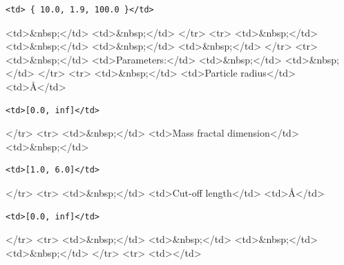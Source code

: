 \begin{verbatim}
<td> { 10.0, 1.9, 100.0 }</td>
\end{verbatim}

\textless{}td\textgreater{}\&nbsp;\textless{}/td\textgreater{} \textless{}td\textgreater{}\&nbsp;\textless{}/td\textgreater{} \textless{}/tr\textgreater{} \textless{}tr\textgreater{} \textless{}td\textgreater{}\&nbsp;\textless{}/td\textgreater{} \textless{}td\textgreater{}\&nbsp;\textless{}/td\textgreater{} \textless{}td\textgreater{}\&nbsp;\textless{}/td\textgreater{} \textless{}td\textgreater{}\&nbsp;\textless{}/td\textgreater{} \textless{}/tr\textgreater{} \textless{}tr\textgreater{} \textless{}td\textgreater{}\&nbsp;\textless{}/td\textgreater{} \textless{}td\textgreater{}Parameters:\textless{}/td\textgreater{} \textless{}td\textgreater{}\&nbsp;\textless{}/td\textgreater{} \textless{}td\textgreater{}\&nbsp;\textless{}/td\textgreater{} \textless{}/tr\textgreater{} \textless{}tr\textgreater{} \textless{}td\textgreater{}\&nbsp;\textless{}/td\textgreater{} \textless{}td\textgreater{}Particle radius\textless{}/td\textgreater{} \textless{}td\textgreater{}\AA{}\textless{}/td\textgreater{}

\begin{verbatim}
<td>[0.0, inf]</td>
\end{verbatim}

\textless{}/tr\textgreater{} \textless{}tr\textgreater{} \textless{}td\textgreater{}\&nbsp;\textless{}/td\textgreater{} \textless{}td\textgreater{}Mass fractal dimension\textless{}/td\textgreater{} \textless{}td\textgreater{}\&nbsp;\textless{}/td\textgreater{}

\begin{verbatim}
<td>[1.0, 6.0]</td>
\end{verbatim}

\textless{}/tr\textgreater{} \textless{}tr\textgreater{} \textless{}td\textgreater{}\&nbsp;\textless{}/td\textgreater{} \textless{}td\textgreater{}Cut-off length\textless{}/td\textgreater{} \textless{}td\textgreater{}\AA{}\textless{}/td\textgreater{}

\begin{verbatim}
<td>[0.0, inf]</td>
\end{verbatim}

\textless{}/tr\textgreater{} \textless{}tr\textgreater{} \textless{}td\textgreater{}\&nbsp;\textless{}/td\textgreater{} \textless{}td\textgreater{}\&nbsp;\textless{}/td\textgreater{} \textless{}td\textgreater{}\&nbsp;\textless{}/td\textgreater{} \textless{}td\textgreater{}\&nbsp;\textless{}/td\textgreater{} \textless{}/tr\textgreater{} \textless{}tr\textgreater{} \textless{}td\textgreater{}\textless{}/td\textgreater{}

